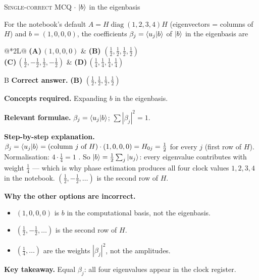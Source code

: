 \documentclass[11pt,a4paper]{article}
\newcommand{\optlabel}[1]{\textbf{(#1)}}
\newcommand{\correctlabel}[1]{\textcolor{okgreen}{\textbf{(#1)}\,\ding{51}}}
\newenvironment{qitem}[1]{\begin{list}{}{\setlength{\leftmargin}{3.3em}\setlength{\labelwidth}{3.1em}%
  \setlength{\labelsep}{0.2em}\setlength{\topsep}{3pt}\setlength{\parsep}{3pt}}\item[\textbf{Q.#1}\hfill]}{\end{list}}
\newcommand{\qsep}{\par\vspace{2pt}{\color{black!15}\hrule}\vspace{4pt}}
\newcommand{\qmeta}[2]{{\footnotesize\color{black!60}\textsc{#1} \;$\cdot$\; #2}\par}
\begin{document}
\begin{qitem}{13}
\qmeta{Single-correct MCQ}{$\ket b$ in the eigenbasis}
For the notebook's default $A = H\operatorname{diag}(1, 2, 3, 4)H$ (eigenvectors = columns of $H$) and $b = (1, 0, 0, 0)$, the coefficients $\beta_j = \braket{u_j|b}$ of
$\ket b$ in the eigenbasis are
\par\smallskip\noindent\begin{tabularx}{\linewidth}{@{}*{2}{L}@{}}
\optlabel{A}\,$(1, 0, 0, 0)$ & \correctlabel{B}\,$(\tfrac12, \tfrac12, \tfrac12, \tfrac12)$ \\[3pt]
\optlabel{C}\,$(\tfrac12, -\tfrac12, \tfrac12, -\tfrac12)$ & \optlabel{D}\,$(\tfrac14, \tfrac14, \tfrac14, \tfrac14)$
\end{tabularx}
\end{qitem}
\begin{solbox}{B}
\textbf{\color{brand}Correct answer.} \textcolor{okgreen}{\textbf{(B)}} $(\tfrac12, \tfrac12, \tfrac12, \tfrac12)$

\textbf{\color{brand}Concepts required.} Expanding $b$ in the eigenbasis.

\textbf{\color{brand}Relevant formulae.} $\beta_j = \braket{u_j|b}$; $\sum|\beta_j|^2 = 1$.

\textbf{\color{brand}Step-by-step explanation.} $\beta_j = \braket{u_j|b} = (\text{column } j \text{ of } H)\cdot(1, 0, 0, 0) = H_{0j} = \tfrac12$ for every $j$ (first row of $H$). Normalisation: $4\cdot\tfrac14 = 1$ \checkmark.
So $\ket b = \tfrac12\sum_j\ket{u_j}$: every eigenvalue contributes with weight $\tfrac14$ --- which is why phase estimation produces all four clock values
$1, 2, 3, 4$ in the notebook. $(\tfrac12, -\tfrac12, \dots)$ is the second row of $H$.

\textbf{\color{brand}Why the other options are incorrect.}
\begin{itemize}[leftmargin=2.4em, itemsep=1pt, topsep=2pt]
\item[\textbf{(A)}] $(1, 0, 0, 0)$ is $b$ in the computational basis, not the eigenbasis.
\item[\textbf{(C)}] $(\frac12, -\frac12, \dots)$ is the second row of $H$.
\item[\textbf{(D)}] $(\frac14, \dots)$ are the weights $|\beta_j|^2$, not the amplitudes.
\end{itemize}
\textbf{\color{brand}Key takeaway.} Equal $\beta_j$: all four eigenvalues appear in the clock register.
\end{solbox}
\qsep
\end{document}
